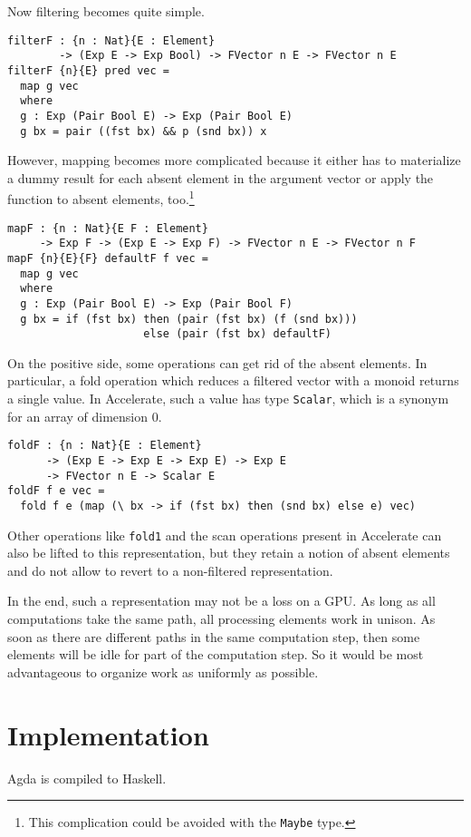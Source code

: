 \documentclass{llncs}
\begin{document}
Now filtering becomes quite simple.
\begin{verbatim}
filterF : {n : Nat}{E : Element}
        -> (Exp E -> Exp Bool) -> FVector n E -> FVector n E
filterF {n}{E} pred vec =
  map g vec
  where
  g : Exp (Pair Bool E) -> Exp (Pair Bool E)
  g bx = pair ((fst bx) && p (snd bx)) x
\end{verbatim}
However, mapping becomes more complicated because it either has to
materialize a dummy result for each absent element in the argument
vector or apply the function to absent elements, too.\footnote{This
  complication could be avoided with the \texttt{Maybe} type.}
\begin{verbatim}
mapF : {n : Nat}{E F : Element}
     -> Exp F -> (Exp E -> Exp F) -> FVector n E -> FVector n F
mapF {n}{E}{F} defaultF f vec =
  map g vec
  where
  g : Exp (Pair Bool E) -> Exp (Pair Bool F)
  g bx = if (fst bx) then (pair (fst bx) (f (snd bx)))
                     else (pair (fst bx) defaultF)
\end{verbatim}
On the positive side, some operations can get rid of the absent
elements. In particular, a fold operation which reduces a filtered
vector with a monoid returns a single value. In Accelerate, such a value has type
\texttt{Scalar}, which is a synonym for an array of dimension $0$.
\begin{verbatim}
foldF : {n : Nat}{E : Element}
      -> (Exp E -> Exp E -> Exp E) -> Exp E
      -> FVector n E -> Scalar E
foldF f e vec =
  fold f e (map (\ bx -> if (fst bx) then (snd bx) else e) vec)
\end{verbatim}
Other operations like \texttt{fold1} and the scan operations present
in Accelerate can also be lifted to this representation, but they
retain a notion of absent elements and do not allow to revert to a
non-filtered representation. 

In the end, such a representation may not be a loss on a GPU. As long
as all computations take the same path, all processing elements work
in unison. As soon as there are different paths in the same
computation step, then some elements will be idle for part of the
computation step. So it would be most advantageous to organize work as
uniformly as possible. 


\section{Implementation}
\label{sec:implementation}

Agda is compiled to Haskell.
\end{document}

